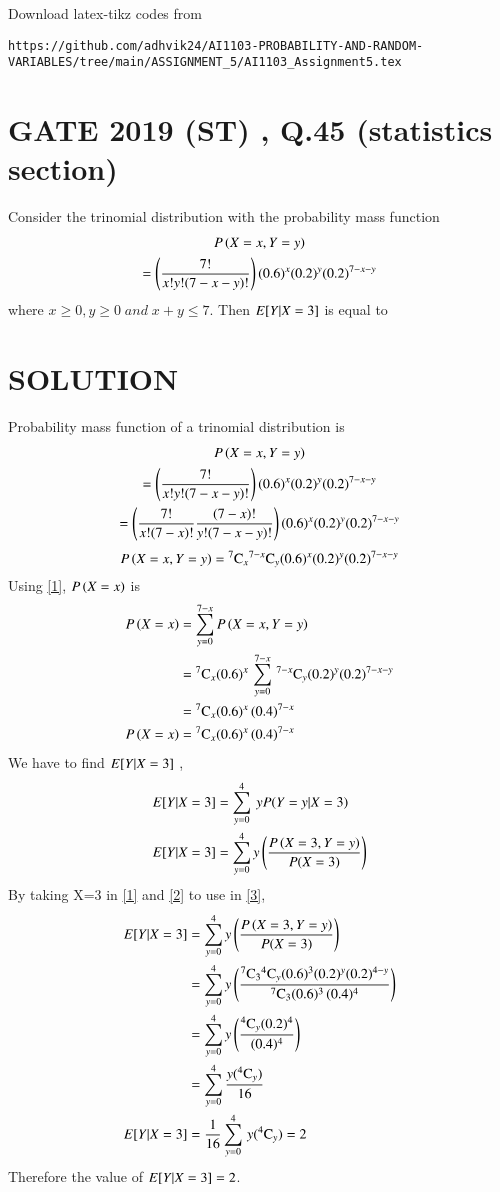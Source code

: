 \documentclass[journal,12pt,twocolumn]{IEEEtran}
\begin{document}
%
Download latex-tikz codes from 
%
\begin{lstlisting}
https://github.com/adhvik24/AI1103-PROBABILITY-AND-RANDOM-VARIABLES/tree/main/ASSIGNMENT_5/AI1103_Assignment5.tex
\end{lstlisting}
\section{GATE 2019 (ST) , Q.45 (statistics section)}
Consider the trinomial distribution with the probability mass function 
\begin{multline}
    \nonumber P\left(X={x} , Y={y}\right)\\=\left(\frac{7!}{x!y!(7-x-y)!}\right)(0.6)^x(0.2)^y(0.2)^{7-x-y}
\end{multline}
where $x\geq0 , y\geq0 \;and\; {x+y}\leq7$.
Then $E[ Y|X=3 ]$ is equal to
\section{SOLUTION}
Probability mass function of a trinomial distribution is
\begin{multline}
   P\left(X={x} , Y={y}\right) \\=\left(\frac{7!}{x!y!(7-x-y)!}\right)(0.6)^x(0.2)^y(0.2)^{7-x-y}\\
  \nonumber  =\left(\frac{7!}{x!(7-x)!}\frac{(7-x)!}{y!(7-x-y)!}\right)(0.6)^x(0.2)^y(0.2)^{7-x-y}
\end{multline}
\begin{equation}
    P\left(X={x} , Y={y}\right)={}^{7}\mathrm{C}_{x}{}^{7-x}\mathrm{C}_{y}(0.6)^x(0.2)^y(0.2)^{7-x-y}\label{1}
\end{equation}
Using \eqref{1}, $P\left(X={x}\right)$ is 
\begin{align}
   \nonumber P\left(X={x}\right)&=\sum_{y=0}^{7-x} P\left(X={x} , Y={y}\right)\\
  \nonumber &={}^{7}\mathrm{C}_{x}(0.6)^x\,\sum_{y=0}^{7-x}\, {}^{7-x}\mathrm{C}_{y} (0.2)^y(0.2)^{7-x-y} \\
  \nonumber  &={}^{7}\mathrm{C}_{x}(0.6)^x\,{(0.4)^{7-x}}\\
    P\left(X={x}\right)&={}^{7}\mathrm{C}_{x}(0.6)^x\,{(0.4)^{7-x}}\label{2}
\end{align}
We have to find $E[ Y|X=3 ]$ ,
\begin{align}
    E[ Y|X=3 ]&=\sum_{y=0}^4 \: y P(Y=y|X=3)\\
    E[ Y|X=3 ]&=\sum_{y=0}^4 y \left(  \frac{ P\left(X={3} , Y={y}\right)}{P(X=3)} \right)\label{3}
\end{align}
By taking X=3 in \eqref{1} and \eqref{2}  to use in \eqref{3},
\begin{align}
   \nonumber E[ Y|X=3 ]&=\sum_{y=0}^4 y \left( \frac{ P\left(X={3} , Y={y}\right)}{P(X=3)}\right)\\
  \nonumber  &=\sum_{y=0}^4 y   \left(\frac{{}^{7}\mathrm{C}_{3}{}^{4}\mathrm{C}_{y}(0.6)^3(0.2)^y(0.2)^{4-y}}{{}^{7}\mathrm{C}_{3}(0.6)^3\,{(0.4)^{4}}}\right)\\
 \nonumber &=\sum_{y=0}^4 y   \left(\frac{{}^{4}\mathrm{C}_{y}(0.2)^{4}}{{(0.4)^{4}}}\right)\\
 &=\sum_{y=0}^4 {\frac{y({}^{4}\mathrm{C}_{y})}{{16}}}\\
  E[ Y|X=3 ]&=\frac{1}{16}\sum_{y=0}^4\, {y({}^{4}\mathrm{C}_{y})}=2
\end{align}
Therefore the value of $E[ Y|X=3 ]=2$.
\end{document}
